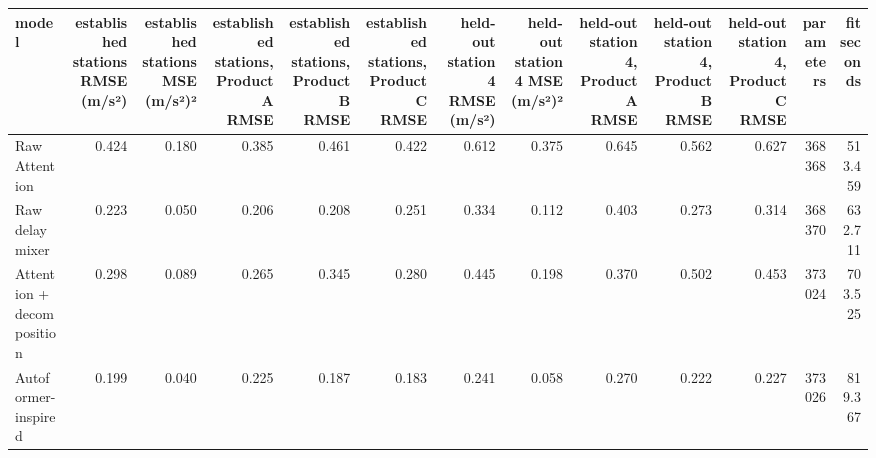 \begin{tabular}{lrrrrrrrrrrrr}
\toprule
model & established stations RMSE (m/s²) & established stations MSE (m/s²)² & established stations, Product A RMSE & established stations, Product B RMSE & established stations, Product C RMSE & held-out station 4 RMSE (m/s²) & held-out station 4 MSE (m/s²)² & held-out station 4, Product A RMSE & held-out station 4, Product B RMSE & held-out station 4, Product C RMSE & parameters & fit seconds \\
\midrule
Raw Attention & 0.424 & 0.180 & 0.385 & 0.461 & 0.422 & 0.612 & 0.375 & 0.645 & 0.562 & 0.627 & 368368 & 513.459 \\
Raw delay mixer & 0.223 & 0.050 & 0.206 & 0.208 & 0.251 & 0.334 & 0.112 & 0.403 & 0.273 & 0.314 & 368370 & 632.711 \\
Attention + decomposition & 0.298 & 0.089 & 0.265 & 0.345 & 0.280 & 0.445 & 0.198 & 0.370 & 0.502 & 0.453 & 373024 & 703.525 \\
Autoformer-inspired & 0.199 & 0.040 & 0.225 & 0.187 & 0.183 & 0.241 & 0.058 & 0.270 & 0.222 & 0.227 & 373026 & 819.367 \\
\bottomrule
\end{tabular}
